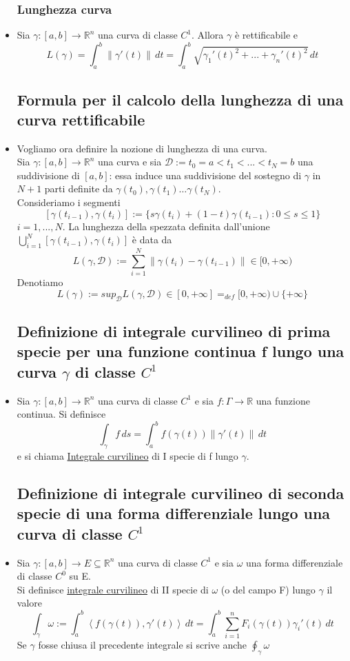 \documentclass{report}
\newcommand{\ace}{\`e }
\newcommand{\Ins}[1]{\mathbb{#1}}
\newcommand{\R}{\Ins{R}}
\newcommand{\tuple}[1]{\left\langle #1 \right\rangle}
\newcommand{\norma}[1]{\left\lVert#1\right\rVert}
\newcommand{\D}{\mathcal{D}}
\newcommand{\g}{\gamma}
\begin{document}
\begin{itemize}
  \subsubsection{Lunghezza curva}
  \item Sia $\g:[a,b]\to\R^n$ una curva di classe $C^1$. Allora $\g$ \ace rettificabile e 
        $$L(\g)= \int_{a}^{b} \norma{\g'(t)} \,dt = \int_{a}^{b} \sqrt{\g_1'(t)^2 + ... + \g_n'(t)^2}\,dt$$

  \subsection{ Formula per il calcolo della lunghezza di una curva rettificabile}
  \item Vogliamo ora definire la nozione di lunghezza di una curva.\\
        Sia $\g:[a,b]\to\R^n$ una curva e sia $\D := {t_0 = a < t_1 < ... < t_N = b}$ 
        una suddivisione di $[a,b]$: essa induce una suddivisione del sostegno di 
        $\g$ in $N+1$ parti definite da 
        $\g(t_0),\g(t_1)\dots \g(t_N)$. \\
        Consideriamo i segmenti
        $$[\g(t_{i-1}),\g(t_i)] := \{s\g(t_i)+(1-t)\g(t_{i-1}) : 0 \leq s \leq 1\}$$
        $i = 1,...,N$. La lunghezza della spezzata definita dall'unione 
        $\bigcup_{i=1}^{N} [\g(t_{i-1}),\g(t_i)]$ \ace data da 
        $$L(\g,\D) := \sum_{i=1}^{N} \norma{\g(t_i)-\g(t_{i-1})} \in [0,+\infty)$$
        Denotiamo 
        $$L(\g) := sup_{\D} L(\g,\D) \in [0,+\infty] =_{def} [0,+\infty) \cup \{+\infty\}$$
  
  \subsection{ Definizione di integrale curvilineo di prima specie per una funzione continua f lungo una curva $\g$ di classe $C^1$}
  \item Sia $\g : [a,b]\to\R^n$ una curva di classe $C^1$ e sia $f:\Gamma \to \R$
        una funzione continua. Si definisce
        $$\int_{\gamma} f \,ds = \int_{a}^{b} f(\gamma(t))\norma{\g'(t)} \,dt$$
        e si chiama \underline{Integrale curvilineo} di I specie di f lungo $\g$.

  \subsection{ Definizione di integrale curvilineo di seconda specie di una forma differenziale lungo una curva di classe $C^1$}
  \item Sia $\g:[a,b]\to E\subseteq\R^n$ una curva di classe $C^1$ e sia
        $\omega$ una forma differenziale di classe $C^0$ su E. \\
        Si definisce \underline{integrale curvilineo} di II specie di $\omega$
        (o del campo F) lungo $\g$ il valore 
        $$\int_{\g} \omega := \int_{a}^{b} \tuple{f(\g(t)), \g'(t)}\,dt = 
          \int_{a}^{b} \sum_{i=1}^{n} F_i(\g(t))\g_i'(t) \,dt$$
        Se $\g$ fosse chiusa il precedente integrale si scrive anche $\oint_{\g} \omega$
  

\end{itemize}
\end{document}
